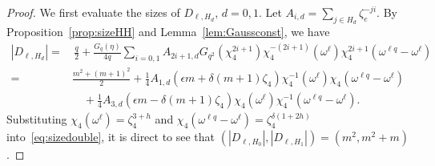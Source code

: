 \documentclass[ALCO,ThmDefs,Unicode]{cedram}
\begin{document}
\begin{proof}
We first evaluate the sizes of $D_{\ell,H_d}$, $d=0,1$. Let $A_{i,d}=\sum_{j\in H_d}\zeta_e^{-ji}$. By Proposition~\ref{prop:sizeHH} and Lemma~\ref{lem:Gaussconst}, we have
\begin{align}\label{eq:sizedouble}
|D_{\ell,H_d}|=&\,\frac{q}{2}+\frac{G_q(\eta)}{4q}\sum_{i=0,1} A_{2i+1,d} G_{q^2}(\chi_4^{2i+1})\chi_4^{-(2i+1)}(\omega^{\ell})\chi_4^{2i+1}(\omega^{\ell q}-\omega^{\ell})\\
=&\frac{m^2+(m+1)^2}{2}+\frac{1}{4}A_{1,d}(\epsilon m+\delta (m+1)\zeta_4)\chi_4^{-1}(\omega^{\ell})\chi_4(\omega^{\ell q}-\omega^{\ell})\nonumber\\
&\quad +\frac{1}{4}A_{3,d}(\epsilon m-\delta (m+1)\zeta_4)\chi_4(\omega^{\ell})\chi_4^{-1}(\omega^{\ell q}-\omega^{\ell}).\nonumber
\end{align}
Substituting $\chi_4(\omega^{\ell})=\zeta_4^{3+h}$ and $\chi_4(\omega^{\ell q}-\omega^{\ell})=\zeta_4^{\delta (1+2h)}$ into~\eqref{eq:sizedouble}, it is direct to see that $(|D_{\ell,H_0}|,|D_{\ell,H_1}|)=(m^2,m^2+m)$.


\end{proof}
\end{document}
